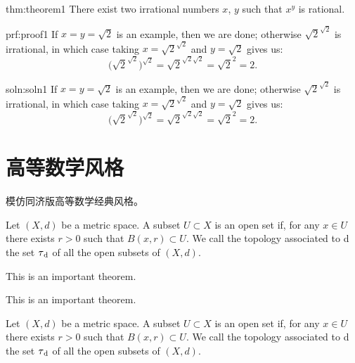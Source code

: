 \begin{theo}{thm:theorem1}
	There exist two irrational numbers $x$, $y$ such that $x^y$ is rational.
\end{theo}

\begin{prf}{prf:proof1}
	If $x=y=\sqrt{2}$ is an example, then we are done; otherwise $\sqrt{2}^{\sqrt{2}}$ is irrational, in which case taking $x=\sqrt{2}^{\sqrt{2}}$ and $y=\sqrt{2}$ gives us:
	\[\bigg(\sqrt{2}^{\sqrt{2}}\bigg)^{\sqrt{2}}=\sqrt{2}^{\sqrt{2}\sqrt{2}}=\sqrt{2}^{2}=2.\]
\end{prf}

\begin{soln}{soln:soln1}
	If $x=y=\sqrt{2}$ is an example, then we are done; otherwise $\sqrt{2}^{\sqrt{2}}$ is irrational, in which case taking $x=\sqrt{2}^{\sqrt{2}}$ and $y=\sqrt{2}$ gives us:
	\[\bigg(\sqrt{2}^{\sqrt{2}}\bigg)^{\sqrt{2}}=\sqrt{2}^{\sqrt{2}\sqrt{2}}=\sqrt{2}^{2}=2.\]
\end{soln}

\section{高等数学风格}

模仿同济版高等数学经典风格。

\begin{Definition}
	Let $(X, d)$ be a metric space. A subset $U \subset X$ is an open set
	if, for any $x \in U$ there exists $r > 0$ such that $B(x, r) \subset
		U$. We call the topology associated to d the set $\tau\textsubscript{d}$
	of all the open subsets of $(X, d).$
\end{Definition}

\begin{Theorem}\label{thm:some-theorem}
	This is an important theorem.
\end{Theorem}

\begin{Corollary}
	This is an important theorem.
\end{Corollary}

\begin{Definition}
	Let $(X, d)$ be a metric space. A subset $U \subset X$ is an open set
	if, for any $x \in U$ there exists $r > 0$ such that $B(x, r) \subset
		U$. We call the topology associated to d the set $\tau\textsubscript{d}$
	of all the open subsets of $(X, d).$
\end{Definition}

